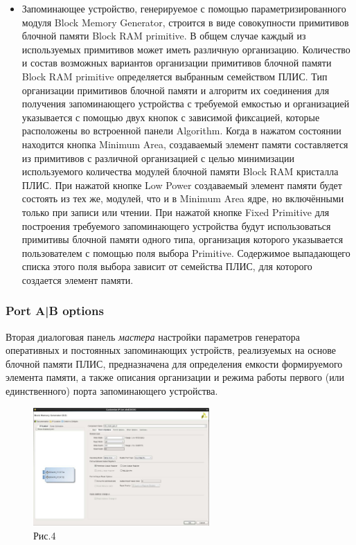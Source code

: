 \begin{itemize}
\item Запоминающее устройство, генерируемое с помощью параметризированного модуля Block Memory Generator, строится в виде совокупности примитивов блочной памяти Block RAM primitive. В общем случае каждый из используемых примитивов может иметь различную организацию. Количество и состав возможных вариантов организации примитивов блочной памяти Block RAM primitive определяется выбранным семейством ПЛИС. Тип организации примитивов блочной памяти и алгоритм их соединения для получения запоминающего устройства с требуемой емкостью и организацией указывается с помощью двух кнопок с зависимой фиксацией, которые расположены во встроенной панели Algorithm. Когда в нажатом состоянии находится кнопка Minimum Area, создаваемый элемент памяти составляется из примитивов с различной организацией с целью минимизации используемого количества модулей блочной памяти Block RAM кристалла ПЛИС. При нажатой кнопке Low Power создаваемый элемент памяти будет состоять из тех же, модулей, что и в Minimum Area ядре, но включёнными только при записи или чтении. При нажатой кнопке Fixed Primitive для построения требуемого запоминающего устройства будут использоваться примитивы блочной памяти одного типа, организация которого указывается пользователем с помощью поля выбора Primitive. Содержимое выпадающего списка этого поля выбора зависит от семейства ПЛИС, для которого создается элемент памяти.
\end{itemize}


\subsubsection{Port A|B options}

Вторая диалоговая панель \emph{мастера} настройки параметров генератора оперативных и постоянных запоминающих устройств, реализуемых на основе блочной памяти ПЛИС, предназначена для определения емкости формируемого элемента памяти, а также описания организации и режима работы первого (или единственного) порта запоминающего устройства. 

\begin{figure}[h]
\centering
\includegraphics[width=0.6\textwidth]{4}
\caption{Рис.4}
\label{4_label}
\end{figure}

